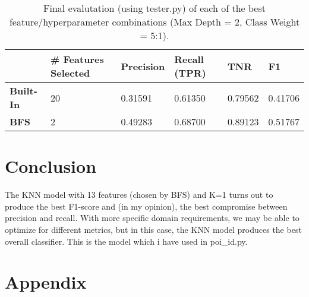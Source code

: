 \documentclass{article}
\begin{document}
\begin{table}[H]
\centering
\caption{Final evalutation (using tester.py) of each of the best feature/hyperparameter combinations (Max Depth = 2, Class Weight = 5:1).}
\label{dtree-results}
\begin{tabular}{|l|l|l|l|l|l|}
\hline
                  & \textbf{\# Features Selected} & \textbf{Precision} & \textbf{Recall (TPR)} & \textbf{TNR} & \textbf{F1} \\ \hline
\textbf{Built-In} & 20                            & 0.31591            & 0.61350               & 0.79562                          & 0.41706     \\ \hline
\textbf{BFS}      & 2                             & 0.49283            & 0.68700               & 0.89123                          & 0.51767     \\ \hline
\end{tabular}
\end{table}

\section{Conclusion}

The KNN model with 13 features (chosen by BFS) and K=1 turns out to produce the best F1-score and (in my opinion), the best compromise between precision and recall. With more specific domain requirements, we may be able to optimize for different metrics, but in this case, the KNN model produces the best overall classifier. This is the model which i have used in poi\_id.py.

\section{Appendix}
\end{document}
